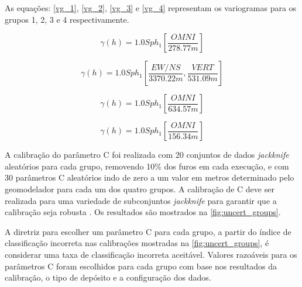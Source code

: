 \begin{figure}[H]
    \hspace{1em}
\end{figure}

As equações: \autoref{vg_1}, \autoref{vg_2}, \autoref{vg_3} e \autoref{vg_4} representam os variogramas para os grupos 1, 2, 3 e 4 respectivamente.

\begin{equation}
    \label{vg_1}
    \gamma(h)=1.0Sph_{1} \left[ \frac{OMNI}{278.77 m} \right]\end{equation}

\begin{equation}
    \label{vg_2}
    \gamma(h)=1.0Sph_{1} \left[ \frac{EW/NS}{3370.22 m},\frac{VERT}{531.09 m} \right]
\end{equation}

\begin{equation}
    \label{vg_3}
    \gamma(h)=1.0Sph_{1} \left[ \frac{OMNI}{634.57 m} \right]
\end{equation}

\begin{equation}
    \label{vg_4}
    \gamma(h)=1.0Sph_{1} \left[ \frac{OMNI}{156.34 m} \right]
\end{equation}

A calibração do parâmetro C foi realizada com 20 conjuntos de dados \textit{jackknife} aleatórios para cada grupo, removendo 10\% dos furos em cada execução, e com 30 parâmetros C aleatórios indo de zero a um valor em metros determinado pelo geomodelador para cada um dos quatro grupos. A calibração de C deve ser realizada para uma variedade de subconjuntos \textit{jackknife} para garantir que a calibração seja robusta \cite{wilde2012kriging}. Os resultados são mostrados na \autoref{fig:uncert_groups}.

A diretriz para escolher um parâmetro C para cada grupo, a partir do índice de classificação incorreta nas calibrações mostradas na \autoref{fig:uncert_groups}, é considerar uma taxa de classificação incorreta aceitável. Valores razoáveis para os parâmetros C foram escolhidos para cada grupo com base nos resultados da calibração, o tipo de depósito e a configuração dos dados.

